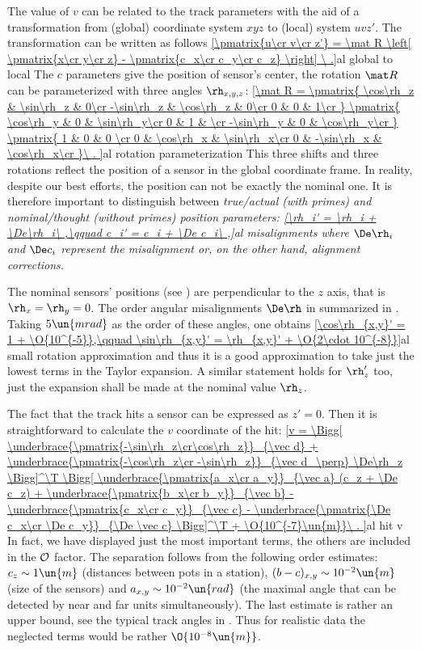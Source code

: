The value of $v$ can be related to the track parameters with the aid of a transformation from (global) coordinate system $xyz$ to (local) system $uvz'$. The transformation can be written as follows
\eqref{\pmatrix{u\cr v\cr z'} = \mat R \left[ \pmatrix{x\cr y\cr z}  - \pmatrix{c_x\cr c_y\cr c_z}  \right] \ .}{al global to local}
The $c$ parameters give the position of sensor's center, the rotation $\mat R$ can be parameterized with three angles $\rh_{x,y,z}$:
\eqref{\mat R =
	\pmatrix{
		\cos\rh_z  & \sin\rh_z & 0\cr
		-\sin\rh_z & \cos\rh_z & 0\cr
		0		   & 0         & 1\cr
	}
	\pmatrix{
		\cos\rh_y  & 0 & \sin\rh_y\cr
		0		   & 1 &          \cr
		-\sin\rh_y & 0 & \cos\rh_y\cr
	}
	\pmatrix{
		1 & 0		   & 0        \cr
		0 & \cos\rh_x  & \sin\rh_x\cr
		0 & -\sin\rh_x & \cos\rh_x\cr
	}\ .
}{al rotation parameterization}
This three shifts and three rotations reflect the position of a sensor in the global coordinate frame. In reality, despite our best efforts, the position can not be exactly the nominal one. It is therefore important to distinguish between \em{true/actual} (with primes) and \em{nominal/thought} (without primes) position parameters:
\eqref{\rh_i' = \rh_i + \De\rh_i\ ,\qquad c_i' = c_i + \De c_i\ ,}{al misalignments}
where $\De\rh_i$ and $\De c_i$ represent the \em{misalignment} or, on the other hand, \em{alignment corrections}.

The nominal sensors' positions (see ) are perpendicular to the $z$ axis, that is $\rh_x=\rh_y=0$. The order angular misalignments $\De\rh$ in summarized in . Taking $5\un{mrad}$ as the order of these angles, one obtains
\eqref{\cos\rh_{x,y}' = 1 + \O{10^{-5}},\qquad \sin\rh_{x,y}' = \rh_{x,y}' + \O{2\cdot 10^{-8}}}{al small rotation approximation}
and thus it is a good approximation to take just the lowest terms in the Taylor expansion. A similar statement holds for $\rh_z'$ too, just the expansion shall be made at the nominal value $\rh_z$.

The fact that the track  hits a sensor can be expressed as $z' = 0$. Then it is straightforward to calculate the $v$ coordinate of the hit:
\eqref{v =
	\Bigg[
		\underbrace{\pmatrix{-\sin\rh_z\cr\cos\rh_z}}_{\vec d}
		+ \underbrace{\pmatrix{-\cos\rh_z\cr -\sin\rh_z}}_{\vec d_\perp} \De\rh_z
	\Bigg]^\T
	\Bigg[
		\underbrace{\pmatrix{a_x\cr a_y}}_{\vec a} (c_z + \De c_z)
		 + \underbrace{\pmatrix{b_x\cr b_y}}_{\vec b}
		 - \underbrace{\pmatrix{c_x\cr c_y}}_{\vec c}
		 - \underbrace{\pmatrix{\De c_x\cr \De c_y}}_{\De \vec c}
	\Bigg]^\T
	+ \O{10^{-7}\un{m}}\ .
}{al hit v}
In fact, we have displayed just the most important terms, the others are included in the $\cal O$ factor. The separation follows from the following order estimates: $c_z \sim 1\un{m}$ (distances between pots in a station), $(b - c)_{x, y} \sim 10^{-2}\un{m}$ (size of the sensors) and $a_{x, y} \sim 10^{-2}\un{rad}$ (the maximal angle that can be detected by near and far units simultaneously). The last estimate is rather an upper bound, see the typical track angles in . Thus for realistic data the neglected terms would be rather $\O{10^{-8}\un{m}}$.

